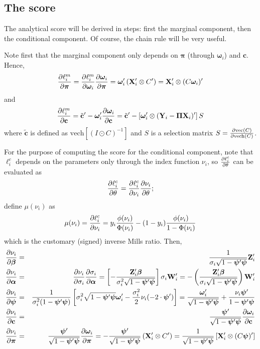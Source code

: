 \documentclass[a4paper,10pt]{article}
\newcommand{\pder}[2]{\ensuremath\frac{\partial #1}{\partial #2}}
\newcommand{\Depvar}{y_{i}}
\newcommand{\Endog}{\mathbf{Y}_{i}}
\newcommand{\Expla}{\mathbf{Z}_{i}}
\newcommand{\ExoInst}{\mathbf{X}_{i}}
\newcommand{\CSReg}{\mathbf{W}_{i}}
\newcommand{\ScRfDist}{\bm{\omega}_i}
\newcommand{\ProbitPar}{\bm{\beta}}
\newcommand{\RfPar}{\bm{\Pi}}
\newcommand{\vRfPar}{\bm{\pi}}
\newcommand{\VarPar}{\bm{\alpha}}
\newcommand{\CondSig}{\sigma_i}
\newcommand{\ScCov}{\bm{\psi}}
\newcommand{\vechC}{\mathbf{c}}
\begin{document}
\subsection{The score}
\label{sec:score}

The analytical score will be derived in steps: first the marginal
component, then the conditional component. Of course, the chain rule
will be very useful.

Note first that the marginal component only depends on $\vRfPar$
(through $\ScRfDist$) and $\vechC$. Hence,
\[
\pder{\ell^m_i}{\vRfPar} = \pder{\ell^m_i}{\ScRfDist}
\pder{\ScRfDist}{\vRfPar} = \ScRfDist' \left( \ExoInst' \otimes C'
\right) =  \ExoInst' \otimes (C \ScRfDist)'
\]
and
\[
\pder{\ell^m_i}{\vechC} = \tilde{\mathbf{c}}' -
\ScRfDist'\pder{\ScRfDist}{\vechC} = \tilde{\mathbf{c}}' -
\left[\ScRfDist' \otimes (\Endog - \RfPar \ExoInst)' \right] S
\]
where $\tilde{\mathbf{c}}$ is defined as $\mathrm{vech}\left[ (I \odot
C)^{-1} \right]$ and $S$ is a selection matrix $S = \pder{\mathrm{vec}(C)}{\mathrm{vech}(C)}$.

For the purpose of computing the score for the conditional component,
note that $\ell^c_i$ depends on the parameters only through the index
function $\nu_i$, so $\pder{\ell^c_i}{\theta}$ can be evaluated as
\[
\pder{\ell^c_i}{\theta} = \pder{\ell^c_i}{\nu_i}\pder{\nu_i}{\theta} ;
\]
define $\mu(\nu_i)$ as
\[
\mu(\nu_i) = \pder{\ell^c_i}{\nu_i} = \Depvar
\frac{\phi(\nu_i)}{\Phi(\nu_i)} - (1-\Depvar)\frac{\phi(\nu_i)}{1
  -\Phi(\nu_i)}
\]
which is the customary (signed) inverse Mills ratio. Then,
\begin{eqnarray*}
  \pder{\nu_i}{\ProbitPar} & = & \frac{1}{\CondSig \sqrt{1- \ScCov'
      \ScCov}} \Expla' \\
  \pder{\nu_i}{\VarPar} & = & \pder{\nu_i}{\CondSig}
  \pder{\CondSig}{\VarPar} =
  \left[- \frac{\Expla'\ProbitPar}
    {\CondSig^2 \sqrt{1- \ScCov' \ScCov}} \right] \CondSig \CSReg' =
  - \left( \frac{\Expla'\ProbitPar}
    {\CondSig \sqrt{1- \ScCov' \ScCov}}\right)  \CSReg' \\
  \pder{\nu_i}{\ScCov} & = &
  \frac{1}{\CondSig^2 (1- \ScCov' \ScCov)}
  \left[ 
    \CondSig^2 \sqrt{1- \ScCov' \ScCov} \ScRfDist' - 
    \frac{\CondSig^2}{2} \nu_i (-2 \cdot \ScCov')
  \right] =
  \frac{ \ScRfDist'}{\sqrt{1- \ScCov' \ScCov}} +
  \frac{\nu_i \ScCov'}{1- \ScCov' \ScCov} \\
  \pder{\nu_i}{\vechC} & = & \frac{\ScCov'}{\sqrt{1- \ScCov'
      \ScCov}} \pder{\ScRfDist}{\vechC} \\
  \pder{\nu_i}{\vRfPar} & = &\frac{\ScCov'}{\sqrt{1- \ScCov'
      \ScCov}} \pder{\ScRfDist}{\vRfPar} = 
      - \frac{\ScCov'}{\sqrt{1- \ScCov' \ScCov}} \left( \ExoInst'
        \otimes C' \right) = 
      \frac{1}{\sqrt{1- \ScCov'\ScCov}} \left[ \ExoInst' \otimes (C\ScCov)' \right]
\end{eqnarray*}
\end{document}
